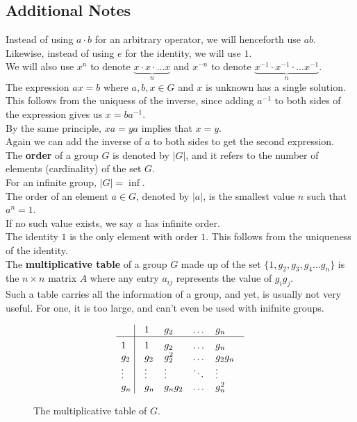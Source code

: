 \documentclass[12pt]{article}
\begin{document}
    \subsection*{Additional Notes}

    Instead of using $a \cdot b$ for an arbitrary operator,
    we will henceforth use $ab$.
    Likewise, instead of using $e$ for the identity, we will use $1$. \\ 
    We will also use $x^n$ to denote
    $\underbrace{x \cdot x \cdot ... x}_{n}$
    and $x^{-n}$ to denote
    $\underbrace{x^{-1} \cdot x^{-1} \cdot ... x^{-1}}_{n}$. \\

    The expression $ax = b$
    where $a, b, x \in G$ and $x$ is unknown
    has a single solution. \\ 
    This follows from the uniquess of the inverse,
    since adding $a^{-1}$ to both sides of the expression
    gives us $x = ba^{-1}$. \\

    By the same principle, $xa = ya$ implies that $x = y$. \\
    Again we can add the inverse of $a$
    to both sides to get the second expression. \\

    The \textbf{order} of a group $G$ is denoted by $|G|$,
    and it refers to the number of elements (cardinality) of the set $G$. \\
    For an infinite group, $|G| = \inf$. \\

    The order of an element $a \in G$, denoted by $|a|$,
    is the smallest value $n$ such that $a^n = 1$. \\
    If no such value exists, we say $a$ has infinite order. \\
    The identity $1$ is the only element with order $1$.
    This follows from the uniqueness of the identity. \\
    
    The \textbf{multiplicative table} of a group
    $G$ made up of the set $\{ 1, g_2, g_3, g_4 \dots g_n \}$
    is the $n \times n$ matrix $A$
    where any entry $a_{ij}$
    represents the value of $g_ig_j$. \\
    Such a table carries all the information of a group,
    and yet, is usually not very useful.
    For one, it is too large,
    and can't even be used with inifnite groups. \\
    \begin{figure}[H]
        \centering
        \[\vbox{\tabskip0.5em\offinterlineskip
        \halign{\strut$#$\hfil\ \tabskip1em\vrule&&$#$\hfil\cr
        ~   & 1   & g_2   & \dots & g_n \cr
        \noalign{\hrule}\vrule height 12pt width 0pt
        1   & 1 & g_2 & \dots & g_n \cr 
        g_2   & g_2 & g_2^2 & \dots & g_2g_n \cr 
        \vdots  & \vdots & \vdots & \ddots & \vdots \cr 
        g_n   & g_n & g_ng_2 & \dots & g_n^2 \cr
        }}\]
        \caption{\label{fig:figure1} The multiplicative table of $G$.}
    \end{figure}
\end{document}
